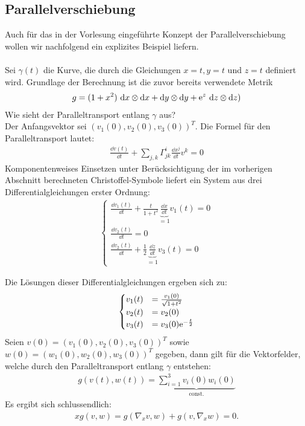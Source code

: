 \subsection{Parallelverschiebung}
Auch für das in der Vorlesung eingeführte Konzept der Parallelverschiebung wollen wir nachfolgend ein explizites Beispiel liefern. \\
\phantom{.}\\
Sei $\gamma(t)$ die Kurve, die durch die Gleichungen $x = t, y = t$ und $z = t$  definiert wird. Grundlage der Berechnung ist die zuvor bereits verwendete Metrik
\begin{align*}
g= (1+x^2)\ \dd x\otimes \dd x + \dd y \otimes \dd y + \mathrm{e}^z \ \dd z \otimes \dd z)
\end{align*} 
Wie sieht der Paralleltransport entlang $\gamma$ aus? \\

Der Anfangsvektor sei $\left(v_1(0), v_2(0), v_3(0) \right)^T$. Die Formel für den Paralleltransport lautet: 
\begin{align*}
\frac{\dd v(t)}{\dd t} + \sum_{j, k} \Gamma_{jk}^i \frac{\dd x^j}{\dd t} v^k =0
\end{align*}
Komponentenweises Einsetzen unter Berücksichtigung der im vorherigen Abschnitt berechneten Christoffel-Symbole liefert ein System aus drei Differentialgleichungen erster Ordnung:
\begin{align*}
\begin{cases}
\frac{\dd v_1(t)}{\dd t} + \frac{t}{1+t^2}\underbrace{\frac{\dd x}{\dd t}}_{= 1} v_1(t) = 0 \\
\frac{\dd v_2(t)}{\dd t} = 0 \\
\frac{\dd v_2(t)}{\dd t} + \frac{1}{2} \underbrace{\frac{\dd z}{\dd t}}_{= 1} v_3(t)= 0 
\end{cases}
\end{align*}

Die Lösungen dieser Differentialgleichungen ergeben sich zu:
\begin{align*}
	\begin{cases}
		v_1(t) &= \frac{v_1(0)}{\sqrt{1+t^2}}\\
	v_2(t) &= v_2(0) \\
	 v_3(t)& = v_3(0)\mathrm{e}^{-\frac{t}{2}}
	\end{cases}
\end{align*}
Seien $v(0) = \left(v_1(0), v_2(0), v_3(0) \right)^T$ sowie $w(0) = \left(w_1(0), w_2(0), w_3(0) \right)^T$ gegeben, dann gilt für die Vektorfelder, welche durch den Paralleltransport entlang $\gamma$ entstehen:
\begin{align*}
g(v(t),w(t)) = \underbrace{\sum_{i=1}^{3} v_i(0)w_i(0)}_{\text{const.}}
\end{align*}
Es ergibt sich schlussendlich:
\begin{align*}
x g(v,w) = g(\nabla_xv,w) + g(v,\nabla_xw) = 0.
\end{align*}
